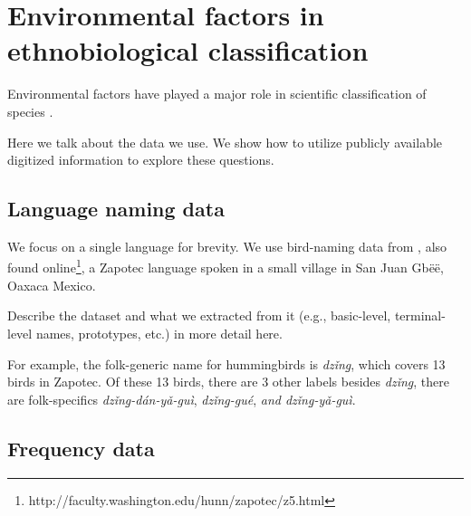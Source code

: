 \documentclass[10pt,letterpaper]{article}
\begin{document}
%
%
%
%
%
%
%


\section{Environmental factors in ethnobiological classification}
Environmental factors have played a major role in scientific classification of species \cite{amadon1943bird,hunn1999size}.

Here we talk about the data we use. We show how to utilize publicly available digitized information to explore these questions.



\subsection{Language naming data}
We focus on a single language for brevity. We use bird-naming data from \cite{hunn2008zapotec}, also found online\footnote{http://faculty.washington.edu/hunn/zapotec/z5.html}, a Zapotec language spoken in a small village in San Juan Gb\"{e}\"{e}, Oaxaca Mexico.

Describe the dataset and what we extracted from it (e.g., basic-level, terminal-level names, prototypes, etc.) in more detail here.

For example, the folk-generic name for hummingbirds is \textit{dz\v{i}n\b{g}}, which covers 13 birds in Zapotec. Of these 13 birds, there are 3 other labels besides \textit{dz\v{i}n\b{g}}, there are folk-specifics \textit{dz\v{i}n\b{g}-d\'{a}n-y\v{a}-gu\`{i}}, \textit{dz\v{i}n\b{g}-gu\'{e}}, \textit{and dz\v{i}n\b{g}-y\v{a}-gu\`{i}}.

\subsection{Frequency data}
\end{document}
